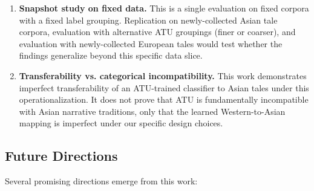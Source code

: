 \documentclass{article}
\begin{document}
\begin{enumerate}
\item \textbf{Snapshot study on fixed data.} This is a single evaluation on fixed corpora with a fixed label grouping. Replication on newly-collected Asian tale corpora, evaluation with alternative ATU groupings (finer or coarser), and evaluation with newly-collected European tales would test whether the findings generalize beyond this specific data slice.

\item \textbf{Transferability vs. categorical incompatibility.} This work demonstrates imperfect transferability of an ATU-trained classifier to Asian tales under this operationalization. It does not prove that ATU is fundamentally incompatible with Asian narrative traditions, only that the learned Western-to-Asian mapping is imperfect under our specific design choices.

\end{enumerate}

\subsection{Future Directions}

Several promising directions emerge from this work:
\end{document}
